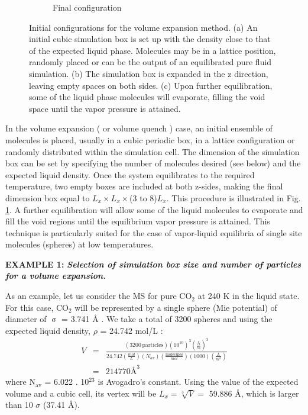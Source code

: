\documentclass[9pt,tutorial]{livecoms}
\begin{document}
\begin{figure}[h]
\begin{subfigure}{0.4\textwidth}
    \caption{Final configuration}
	\end{subfigure}
  \caption{Initial configurations for the volume expansion method. (a) An initial
cubic simulation box is set up with the density close to that of the expected
liquid phase. Molecules may be in a lattice position, randomly placed or can be
the output of an equilibrated pure fluid simulation. (b) The simulation box is
expanded in the z direction, leaving empty spaces on both sides. (c) Upon
further equilibration, some of the liquid phase molecules will evaporate,
filling the void space until the vapor pressure is attained.}
\label{fig:5}
\end{figure}

In the volume expansion ( or volume quench \citep{holcomb1993} ) case,
an initial ensemble of molecules is placed,  usually in a cubic periodic box,
in a lattice configuration or randomly distributed within the simulation cell.
The dimension of the simulation box can be set by specifying the number of
molecules desired (see below) and the expected liquid density. Once the system
equilibrates to the required temperature, two empty boxes are included at both
z-sides, making the final dimension box equal to $L_{x}
\times L_{x} \times$(3 to 8)$L_{x}$. This procedure is illustrated in Fig. \ref{fig:5}.
A further equilibration will
allow some of the liquid molecules to evaporate and fill the void regions until
the equilibrium vapor pressure is attained. This technique is particularly
suited for the case of vapor-liquid equilibria of single site molecules
(spheres) at low temperatures. 


\begin{mdframed}[linewidth=0pt,backgroundcolor=LiveCoMSLightBlue!8,fontcolor=LiveCoMSDarkBlue!80!black]
\textbf{EXAMPLE 1:} \textbf{\textit{Selection of simulation box size and number of particles for a volume expansion.}}

As an example, let us consider the MS for pure CO$_{2}$ at 240 K in the liquid
state. For this case, CO$_{2}$ will be represented by a single sphere (Mie
potential) of diameter of {${\upsigma}$} = 3.741 \AA{} \citep{avendano2011}. We take a total of 3200 spheres
and using the expected liquid density, ${\rho}$ = 24.742 mol/L \citep{lemmon2013}:
\begin{eqnarray}
  V & = & \frac{\left(3200\,\textrm{particles}\right)\left(10^{10}\right)^{3}\left(\frac{\textrm{Å}}{m}\right)^{3}}{24.742\left(\frac{mol}{L}\right)\left(N_{av}\right)\left(\frac{\textrm{molecules}}{mol}\right)\left(1000\right)\left(\frac{L}{m^{3}}\right)}\nonumber\\
  & = & 214770\textrm{Å}^{3}
\end{eqnarray}
where N$_{\mathrm{av}}$ = 6.022 . 10$^{23}$ is Avogadro's constant. Using the
value of the expected volume and a cubic cell, its vertex will be
$L_x = \sqrt[3]{V} = $ 59.886 \AA{}, which is larger than 10 $\sigma$  (37.41
\AA{}). 
\end{mdframed}
\end{document}
